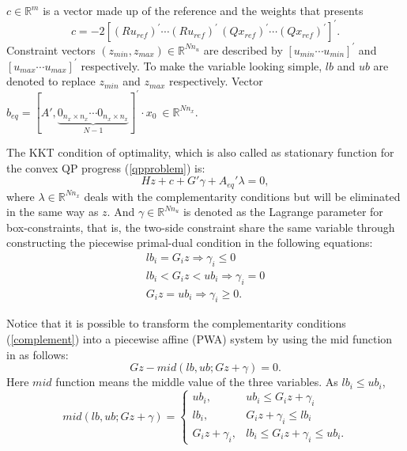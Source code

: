 \documentclass[journal]{IEEEtran}
\begin{document}
$c \in {\mathbb{R}^{m}}$ is a vector made up of the reference and the weights that presents
\begin{equation}
c = {-2   \left[ {{{(R{u_{ref}})}^\prime } \cdots {{(R{u_{ref}})}^\prime }\,{{(Q{x_{ref}})}^\prime } \cdots {{(Q{x_{ref}})}^\prime }} \right]^\prime }.
\end{equation}
Constraint vectors $(z_{min},z_{max}) \in \mathbb{R}^{Nn_u} $ are described by ${\left[ {{u_{min }} \cdots {u_{min }}} \right]^\prime }$ and ${\left[ {{u_{max }} \cdots {u_{max }}} \right]^\prime }$ respectively. To make the variable looking simple, $lb$ and $ub$ are denoted to replace $z_{min}$ and $z_{max}$ respectively. Vector ${b_{eq}} = {\left[ {A',\underbrace {{0_{{n_x} \times {n_x}}} \cdots {0_{{n_x} \times {n_x}}}}_{N - 1}} \right]^\prime }\cdot {x_0} \ \in \mathbb{R}^{Nn_x}$.

The KKT condition of optimality, which is also called as stationary function for the convex QP progress (\ref{qpproblem}) is:
\begin{equation}\label{stationary}
Hz + c + G'\gamma  + {A_{eq}'}\lambda  = 0 ,
\end{equation}
where $\lambda \in \mathbb{R}^{Nn_x}$ deals with the complementarity conditions but will be eliminated in the same way as $z$. And $\gamma \in \mathbb{R}^{Nn_u}$  is denoted as the Lagrange parameter for box-constraints, that is, the two-side constraint share the same variable through constructing the piecewise primal-dual condition in the following equations:
\begin{equation}\label{complement}
\begin{array}{l}
l{b_i} = {G_i}z \Rightarrow {\gamma _i} \le 0\\
l{b_i} < {G_i}z < u{b_i} \Rightarrow {\gamma _i} = 0\\
{G_i}z = u{b_i} \Rightarrow {\gamma _i} \ge 0 .
\end{array}
\end{equation}

Notice that it is possible to transform the complementarity conditions (\ref{complement}) into a piecewise affine (PWA) system by using the mid function in \cite{li1998regularized} as follows:
\begin{equation}\label{pwa1}
Gz - mid(lb,ub;Gz + \gamma ) = 0.
\end{equation}
Here $mid$ function means the middle value of the three variables. As $l{b_i} \le u{b_i}$,
\begin{equation}\label{middefi}
mid\left( {lb,ub;Gz + \gamma } \right) = \left\{ {\begin{array}{*{20}{c}}
	{u{b_i},}&{u{b_i} \le {G_i}z + {\gamma _i}}\\
	{l{b_i},}&{{G_i}z + {\gamma _i} \le l{b_i}}\\
	{{G_i}z + {\gamma _i},}&{l{b_i} \le {G_i}z + {\gamma _i} \le u{b_i}}.
	\end{array}} \right.
\end{equation}
\end{document}
